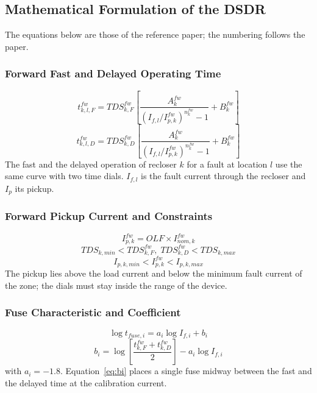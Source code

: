 \documentclass[12pt,letterpaper]{article}
\begin{document}
\subsection{Mathematical Formulation of the DSDR}
The equations below are those of the reference paper; the numbering follows the paper.

\subsubsection{Forward Fast and Delayed Operating Time}
\begin{equation}
t^{fw}_{k,l,F} = TDS^{fw}_{k,F}\left[\frac{A^{fw}_{k}}{\left(I_{f,l}/I^{fw}_{p,k}\right)^{n^{fw}_{k}}-1}+B^{fw}_{k}\right]
\label{eq:tf}
\end{equation}
\begin{equation}
t^{fw}_{k,l,D} = TDS^{fw}_{k,D}\left[\frac{A^{fw}_{k}}{\left(I_{f,l}/I^{fw}_{p,k}\right)^{n^{fw}_{k}}-1}+B^{fw}_{k}\right]
\label{eq:td}
\end{equation}
The fast and the delayed operation of recloser $k$ for a fault at location $l$ use the same curve with two
time dials. $I_{f,l}$ is the fault current through the recloser and $I_p$ its pickup.

\subsubsection{Forward Pickup Current and Constraints}
\begin{equation}
I^{fw}_{p,k} = OLF \times I^{fw}_{nom,k}
\label{eq:ipfw}
\end{equation}
\begin{equation}
TDS_{k,min} < TDS^{fw}_{k,F},\; TDS^{fw}_{k,D} < TDS_{k,max}
\label{eq:tdslim}
\end{equation}
\begin{equation}
I_{p,k,min} < I^{fw}_{p,k} < I_{p,k,max}
\label{eq:iplim}
\end{equation}
The pickup lies above the load current and below the minimum fault current of the zone; the dials must stay
inside the range of the device.

\subsubsection{Fuse Characteristic and Coefficient}
\begin{equation}
\log t_{fuse,i} = a_i \log I_{f,i} + b_i
\label{eq:fuse}
\end{equation}
\begin{equation}
b_i = \log\!\left[\frac{t^{fw}_{k,F}+t^{fw}_{k,D}}{2}\right] - a_i \log I_{f,i}
\label{eq:bi}
\end{equation}
with $a_i=-1.8$. Equation~\eqref{eq:bi} places a single fuse midway between the fast and the delayed time at
the calibration current.
\end{document}
